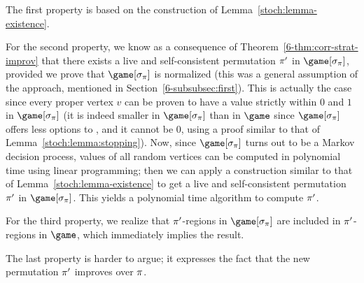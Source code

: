 The first property is based on the construction of
Lemma~\ref{stoch:lemma-existence}.

For the second property, we know as a consequence of
Theorem~\ref{6-thm:corr-strat-improv} that there exists a live and
self-consistent permutation $\pi'$ in $\game[\sigma_{\perm}]$,
provided we prove that $\game[\sigma_{\perm}]$ is normalized (this was
a general assumption of the approach, mentioned in
Section~\ref{6-subsubsec:first}). This is actually the case since
every proper vertex $v$ can be proven to have a value strictly within
$0$ and $1$ in $\game[\sigma_{\perm}]$ (it is indeed smaller in
$\game[\sigma_{\perm}]$ than in $\game$ since $\game[\sigma_{\perm}]$
offers less options to \Eve, and it cannot be $0$, using a proof
similar to that of Lemma~\ref{stoch:lemma:stopping}).
Now, since $\game[\sigma_\perm]$ turns out to be a Markov decision
process, values of all random vertices can be computed in polynomial
time using linear programming; then we can apply a construction
similar to that of Lemma~\ref{stoch:lemma-existence} to get a live and
self-consistent permutation $\pi'$ in $\game[\sigma_\perm]$. This
yields a polynomial time algorithm to compute $\pi'$.

For the third property, we realize that
$\pi'$-regions in $\game[\sigma_\perm]$ are included in
$\pi'$-regions in $\game$, which immediately implies the result.


The last property is harder to argue; it expresses the fact that the
new permutation $\pi'$ improves over $\pi$.  %


